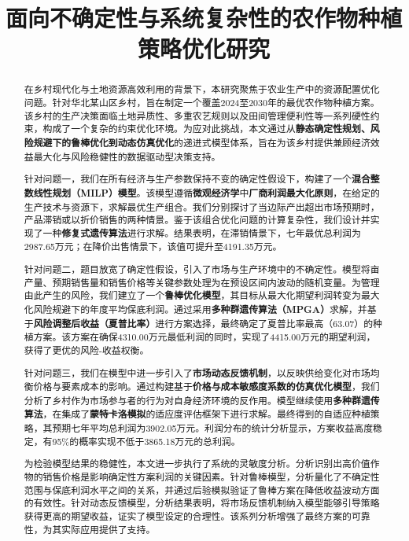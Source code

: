 \documentclass[withoutpreface,bwprint]{cumcmthesis} %
\title{面向不确定性与系统复杂性的农作物种植策略优化研究}
\begin{document}
\maketitle
\begin{abstract}
在乡村现代化与土地资源高效利用的背景下，本研究聚焦于农业生产中的资源配置优化问题。针对华北某山区乡村，旨在制定一个覆盖2024至2030年的最优农作物种植方案。该乡村的生产决策面临土地异质性、多重农艺规则以及田间管理便利性等一系列硬性约束，构成了一个复杂的约束优化环境。为应对此挑战，本文通过从\textbf{静态确定性规划、风险规避下的鲁棒优化到动态仿真优化}的递进式模型体系，旨在为该乡村提供兼顾经济效益最大化与风险稳健性的数据驱动型决策支持。

针对问题一，我们在所有经济与生产参数保持不变的确定性假设下，构建了一个\textbf{混合整数线性规划（MILP）模型}。该模型遵循\textbf{微观经济学}中\textbf{厂商利润最大化原则}，在给定的生产技术与资源下，求解最优生产组合。我们分别探讨了当边际产出超出市场预期时，产品滞销或以折价销售的两种情景。鉴于该组合优化问题的计算复杂性，我们设计并实现了一种\textbf{修复式遗传算法}进行求解。结果表明，在滞销情景下，七年最优总利润为2987.65万元；在降价出售情景下，该值可提升至4191.35万元。

针对问题二，题目放宽了确定性假设，引入了市场与生产环境中的不确定性。模型将亩产量、预期销售量和销售价格等关键参数处理为在预设区间内波动的随机变量。为管理由此产生的风险，我们建立了一个\textbf{鲁棒优化模型}，其目标从最大化期望利润转变为最大化风险规避下的年度平均保底利润。通过采用\textbf{多种群遗传算法（MPGA）}求解，并基于\textbf{风险调整后收益（夏普比率）}进行方案选择，最终确定了夏普比率最高（63.07）的种植方案。该方案在确保4310.00万元最低利润的同时，实现了4415.00万元的期望利润，获得了更优的风险-收益权衡。

针对问题三，我们在模型中进一步引入了\textbf{市场动态反馈机制}，以反映供给变化对市场均衡价格与要素成本的影响。通过构建基于\textbf{价格与成本敏感度系数的仿真优化模型}，我们分析了乡村作为市场参与者的行为对自身经济环境的反作用。模型继续使用\textbf{多种群遗传算法}，在集成了\textbf{蒙特卡洛模拟}的适应度评估框架下进行求解。最终得到的自适应种植策略，其预期七年平均总利润为3902.05万元。利润分布的统计分析显示，方案收益高度稳定，有95\%的概率实现不低于3865.18万元的总利润。

为检验模型结果的稳健性，本文进一步执行了系统的灵敏度分析。分析识别出高价值作物的销售价格是影响确定性方案利润的关键因素。针对鲁棒模型，分析量化了不确定性范围与保底利润水平之间的关系，并通过后验模拟验证了鲁棒方案在降低收益波动方面的有效性。针对动态反馈模型，分析结果表明，将市场反馈机制纳入模型能够引导策略获得更高的期望收益，证实了模型设定的合理性。该系列分析增强了最终方案的可靠性，为其实际应用提供了支持。





\end{abstract}






















\newpage



\newpage
\end{document}

